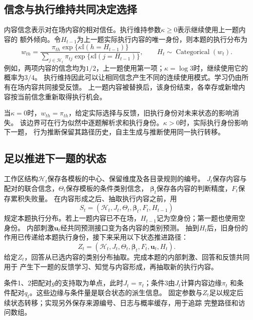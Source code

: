 \documentclass[11pt,a4paper]{article}
\numberwithin{equation}{section}
\newcommand{\ind}{\mathbb{I}}
\begin{document}
\subsection{信念与执行维持共同决定选择}
内容信念表示对在场内容的相对信任。执行维持参数$\kappa\geq0$表示继续使用上一题内容的
额外倾向。令$H_{t-1}$为上一题实际执行内容的唯一身份，则本题的执行分布为
\begin{equation}
w_{th}=\frac{\pi_{th}\exp\{\kappa\ind(h=H_{t-1})\}}
{\sum_{j\in\mathcal H_t}\pi_{tj}\exp\{\kappa\ind(j=H_{t-1})\}},
\qquad H_t\sim\operatorname{Categorical}(w_t).
\label{eq:execution-policy}
\end{equation}
例如，两项内容的信念均为$1/2$，上一题使用第一项；$\kappa=\log3$时，继续使用它的概率为$3/4$。
执行维持因此可以让相同信念产生不同的连续使用模式。学习仍由所有在场内容共同接受反馈。
上一题内容被替换后，该身份结束，各幸存或新增内容按当前信念重新取得执行机会。

当$\kappa=0$时，$w_{th}=\pi_{th}$，给定实际选择与反馈，旧执行身份对未来状态的影响消失。
该边界可在行为似然中逐题解析求和执行身份。$\kappa>0$时，实际执行身份影响下一题，
行为推断保留其路径历史，自主生成与推断使用同一执行转移。

\subsection{足以推进下一题的状态}
工作区结构$\mathcal H_t$保存各模板的中心、保留维度及各目录规则的编号。
$J_t$保存内容与配对的联合信念，$\Theta_t$保存模板的条件类别信念，
$\boldsymbol\beta_t$保存各内容的判断精度，$F_t$保存累积失败量。
在内容形成之后、抽取执行内容之前，用
\begin{equation}
S_t=(\mathcal H_t,J_t,\Theta_t,\boldsymbol\beta_t,F_t,H_{t-1})
\label{eq:minimal-state}
\end{equation}
规定本题执行分布。若上一题内容已不在场，$H_{t-1}$记为空身份；第一题也使用空身份。
内部刺激$\bm u_t$经共同预测接口变为各内容的类别预测。
抽到$H_t$后，旧身份的作用已传递给本题执行身份，接下来采用以下状态推进路径：
\begin{equation}
Z_t=(\mathcal H_t,J_t,\Theta_t,\boldsymbol\beta_t,F_t,\bm u_t,H_t).
\label{eq:path-state}
\end{equation}
给定$Z_t$，回答从已选内容的类别分布抽取。完成本题的内部刺激、回答和反馈共同用于
产生下一题的反馈学习、知觉与内容形成，再抽取新的执行内容。

条件1、2把配对$g$的支持取为单点，此时$J_t=\pi_t$；条件3由$J_t$计算内容边缘$\pi_t$
和条件配对$q_t$。这些边缘与条件量是联合状态的派生信息。
固定参数与$Z_t$足以规定后续状态转移；实现另外保存来源编号、日志与概率缓存，用于追踪
完整路径和访问数组。
\end{document}
